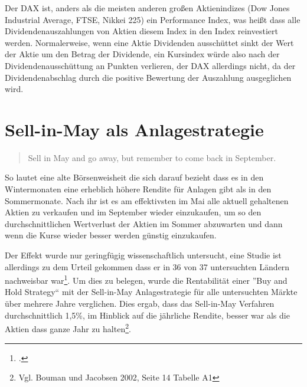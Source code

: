 \documentclass[12pt, a4paper, titlepage]{report}
\begin{document}
            Der DAX ist, anders als die meisten anderen großen
            Aktienindizes (Dow Jones Industrial Average, FTSE, Nikkei 225) ein
            Performance Index, was heißt dass alle Dividendenauszahlungen von Aktien
            diesem Index in den Index reinvestiert werden. Normalerweise, wenn eine Aktie
            Dividenden ausschüttet sinkt der Wert der Aktie um den Betrag der Dividende,
            ein Kursindex würde also nach der Dividendenausschüttung an Punkten verlieren,
            der DAX allerdings nicht, da der Dividendenabschlag durch die positive
            Bewertung der Auszahlung ausgeglichen wird.
            

        \section{Sell-in-May als Anlagestrategie}
            \begin{quote}
                Sell in May and go away, but remember to come back in September.
            \end{quote}
            So lautet eine alte Börsenweisheit die sich darauf bezieht dass es
            in den Wintermonaten eine erheblich höhere Rendite für Anlagen gibt
            als in den Sommermonate. Nach ihr ist es am effektivsten im Mai alle
            aktuell gehaltenen Aktien zu verkaufen und im September wieder
            einzukaufen, um so den durchschnittlichen Wertverlust der Aktien im
            Sommer abzuwarten und dann wenn die Kurse wieder besser werden
            günstig einzukaufen.

            Der Effekt wurde nur geringfügig wissenschaftlich untersucht, eine
            Studie ist allerdings zu dem Urteil gekommen dass er in 36 von 37
            untersuchten Ländern nachweisbar war\footcite{bouman2002halloween}.
            Um dies zu belegen, wurde die Rentabilität einer ''Buy and Hold Strategy``
            mit der Sell-in-May Anlagestrategie für alle untersuchten Märkte über
            mehrere Jahre verglichen. Dies ergab, dass das Sell-in-May Verfahren 
            durchschnittlich 1,5\%, im Hinblick auf die jährliche Rendite, besser
            war als die Aktien dass ganze Jahr zu halten\footnote{Vgl. Bouman und Jacobsen 2002, Seite 14 Tabelle A1}.
\end{document}
